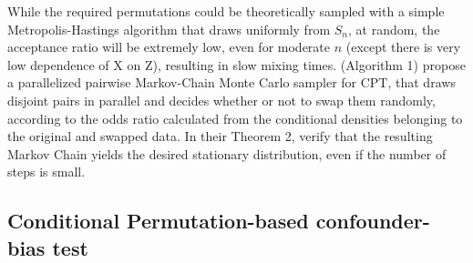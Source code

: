 \documentclass{article}
\begin{document}
While the required permutations could be theoretically sampled with a simple Metropolis-Hastings algorithm that draws uniformly from $S_n$, at random, the acceptance ratio will be extremely low, even for moderate $n$ (except there is very low dependence of X on Z), resulting in slow mixing times. \cite{berrett2020conditional} (Algorithm 1) propose a parallelized pairwise Markov-Chain Monte Carlo sampler for CPT, that draws disjoint pairs in parallel and decides whether or not to swap them randomly, according to the odds ratio calculated from the conditional densities belonging to the original and swapped data. In their Theorem 2, \cite{berrett2020conditional} verify that the resulting Markov Chain yields the desired stationary distribution, even if the number of steps is small.

\subsection{Conditional Permutation-based confounder-bias test}
\end{document}
